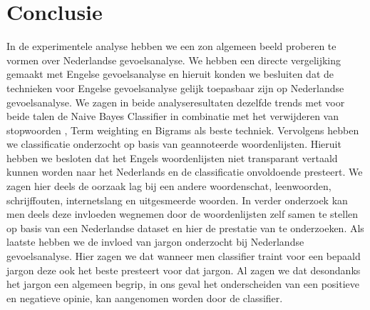 \chapter{Conclusie}\label{Conclusie}

In de experimentele analyse hebben we een zo\’n algemeen beeld proberen te vormen over Nederlandse gevoelsanalyse. We hebben een directe vergelijking gemaakt met Engelse gevoelsanalyse en hieruit konden we besluiten dat de technieken voor Engelse gevoelsanalyse gelijk toepasbaar zijn op Nederlandse gevoelsanalyse. We zagen in beide analyseresultaten dezelfde trends met voor beide talen de Naive Bayes Classifier in combinatie met het verwijderen van stopwoorden , Term weighting en Bigrams als beste techniek. Vervolgens hebben we classificatie onderzocht op basis van geannoteerde woordenlijsten. Hieruit hebben we besloten dat het Engels woordenlijsten niet transparant vertaald kunnen worden naar het Nederlands en de classificatie onvoldoende presteert. We zagen hier deels de oorzaak lag bij een andere woordenschat, leenwoorden, schrijffouten, internetslang en uitgesmeerde woorden. In verder onderzoek kan men deels deze invloeden wegnemen door de woordenlijsten zelf samen te stellen op basis van een Nederlandse dataset en hier de prestatie van te onderzoeken. Als laatste hebben we de invloed van jargon onderzocht bij Nederlandse gevoelsanalyse. Hier zagen we dat wanneer men classifier traint voor een bepaald jargon deze ook het beste presteert voor dat jargon. Al zagen we dat desondanks het jargon een algemeen begrip, in ons geval het onderscheiden van een positieve en negatieve opinie, kan aangenomen worden door de classifier. 